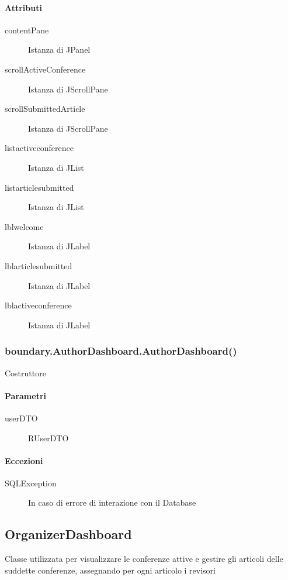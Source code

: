 \paragraph{Attributi}
\begin{description}
\item[contentPane] Istanza di JPanel 
\item[scrollActiveConference] Istanza di JScrollPane
\item[scrollSubmittedArticle] Istanza di JScrollPane
\item[listactiveconference] Istanza di JList
\item[listarticlesubmitted] Istanza di JList
\item[lblwelcome] Istanza di JLabel
\item[lblarticlesubmitted] Istanza di JLabel
\item[lblactiveconference] Istanza di JLabel
\end{description}

\subsubsection{boundary.AuthorDashboard.AuthorDashboard()}
Costruttore
\paragraph{Parametri}
\begin{description}
\item[userDTO] RUserDTO
\end{description}
\paragraph{Eccezioni}
\begin{description}
\item[SQLException] In caso di errore di interazione con il Database
\end{description}

\subsection{OrganizerDashboard}
Classe utilizzata per visualizzare le conferenze attive e gestire gli articoli delle suddette conferenze, assegnando per ogni articolo i revisori
